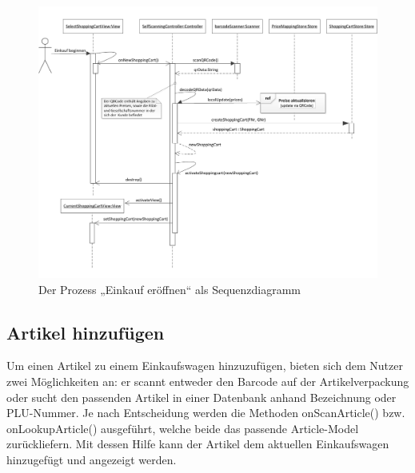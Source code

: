 \begin{figure}[H]
\includegraphics[width=\linewidth]{res/seq_einkauf-eroeffnen.pdf}
\caption{Der Prozess „Einkauf eröffnen“ als Sequenzdiagramm}\label{seq:einkauf-eroeffnen}
\end{figure}

\subsection{Artikel hinzufügen}
Um einen Artikel zu einem Einkaufswagen hinzuzufügen, bieten sich dem Nutzer zwei Möglichkeiten an: er scannt entweder den Barcode auf der Artikelverpackung oder sucht den passenden Artikel in einer Datenbank anhand Bezeichnung oder PLU-Nummer. Je nach Entscheidung werden die Methoden onScanArticle() bzw. onLookupArticle() ausgeführt, welche beide das passende Article-Model zurückliefern. Mit dessen Hilfe kann der Artikel dem aktuellen Einkaufswagen hinzugefügt und angezeigt werden.

